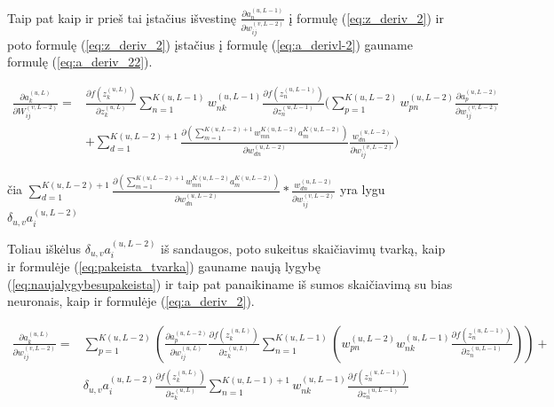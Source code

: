 Taip pat kaip ir prieš tai įstačius išvestinę $\frac{\partial a_n^{(u,L-1)}}{\partial w_{ij}^{(v,L-2)}}$ į formulę (\ref{eq:z_deriv_2}) ir poto formulę (\ref{eq:z_deriv_2}) įstačius į formulę (\ref{eq:a_derivl-2}) gauname formulę (\ref{eq:a_deriv_22}).


\begin{equation}\label{eq:a_deriv_22}
  \begin{aligned}
    \frac{\partial a_k^{(u, L)}}{\partial W_{ij}^{(v,L-2)}} =&
      \frac{\partial f(z_k^{(u, L)})}{\partial z_k^{(u,L)}} \sum_{n=1}^{K(u, L-1)} w_{nk}^{(u,L-1)}
      \frac{\partial f(z_n^{(u, L-1)})}{\partial z_n^{(u,L-1)}}
      (\sum_{p=1}^{K(u, L-2)} w_{pn}^{(u,L-2)}
      \frac{\partial a_p^{(u,L-2)}}{\partial w_{ij}^{(v,L-2)}} \\
    &+ \sum_{d=1}^{K(u,L-2)+1} \frac{\partial (\sum_{m=1}^{K(u,L-2)+1} w_{mn}^{K(u,L-2)} a_m^{K(u,L-2)})}{\partial w_{dn}^{(u,L-2)}}
      \frac{w_{dn}^{(u,L-2)}}{\partial w_{ij}^{(v,L-2)}})
  \end{aligned}
\end{equation}





čia $ \sum_{d=1}^{K(u,L-2)+1} \frac{\partial (\sum_{m=1}^{K(u,L-2)+1} w_{mn}^{K(u,L-2)} a_m^{K(u,L-2)})}{\partial w_{dn}^{(u,L-2)}} *
\frac{w_{dn}^{(u,L-2)}}{\partial w_{ij}^{(v,L-2)}}$ yra lygu $\delta_{u,v}a_i^{(u,L-2)}$

Toliau iškėlus $\delta_{u,v}a_i^{(u,L-2)}$ iš sandaugos, poto sukeitus skaičiavimų tvarką, kaip ir formulėje (\ref{eq:pakeista_tvarka}) gauname naują lygybę (\ref{eq:naujalygybesupakeista}) ir taip pat panaikiname iš sumos skaičiavimą su bias neuronais, kaip ir formulėje (\ref{eq:a_deriv_2}).

\begin{equation}\label{eq:naujalygybesupakeista}
  \begin{aligned}
    \frac{\partial a_k^{(u, L)}}{\partial w_{ij}^{(v,L-2)}} = &
      \sum_{p=1}^{K(u,L-2)} \left ( \frac{ \partial a_p^{(u,L-2)} }{ \partial w_{ij}^{(u,L)} }\frac{ \partial f(z_k^{(u,L)}) }{ \partial z_k^{(u,L)} } \sum_{n=1}^{K(u,L-1)}\left( w_{pn}^{(u,L-2)}w_{nk}^{(u,L-1)}\frac{ \partial f(z_n^{(u,L-1)}) }{ \partial z_n^{(u,L-1)}} \right ) \right  )+\\
       &\delta_{u,v}a_i^{(u,L-2)}\frac{\partial f(z_k^{(u,L)})}{\partial z_k^{(u,L)}}\sum_{n=1}^{K(u,L-1)+1} w_{nk}^{(u,L-1)} \frac{\partial f(z_n^{(u,L-1)})}{\partial z_n^{(u,L-1)}}
  \end{aligned}
\end{equation}


